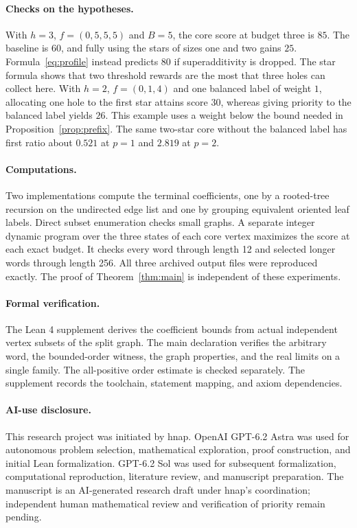 \documentclass[11pt]{article}
\theoremstyle{definition}\newtheorem{example}[theorem]{Example}
\begin{document}
\paragraph{Checks on the hypotheses.}
With $h=3$, $f=(0,5,5,5)$ and $B=5$, the core score at budget three is $85$. The baseline is $60$, and fully using the stars of sizes one and two gains $25$. Formula~\eqref{eq:profile} instead predicts $80$ if superadditivity is dropped. The star formula shows that two threshold rewards are the most that three holes can collect here. With $h=2$, $f=(0,1,4)$ and one balanced label of weight $1$, allocating one hole to the first star attains score $30$, whereas giving priority to the balanced label yields $26$. This example uses a weight below the bound needed in Proposition~\ref{prop:prefix}. The same two-star core without the balanced label has first ratio about $0.521$ at $p=1$ and $2.819$ at $p=2$.

\paragraph{Computations.}
Two implementations compute the terminal coefficients, one by a rooted-tree recursion on the undirected edge list and one by grouping equivalent oriented leaf labels. Direct subset enumeration checks small graphs. A separate integer dynamic program over the three states of each core vertex maximizes the score at each exact budget. It checks every word through length 12 and selected longer words through length 256. All three archived output files were reproduced exactly. The proof of Theorem~\ref{thm:main} is independent of these experiments.

\paragraph{Formal verification.}
The Lean 4 supplement derives the coefficient bounds from actual independent vertex subsets of the split graph. The main declaration verifies the arbitrary word, the bounded-order witness, the graph properties, and the real limits on a single family. The all-positive order estimate is checked separately. The supplement records the toolchain, statement mapping, and axiom dependencies.

\paragraph{AI-use disclosure.} This research project was initiated by hnap. OpenAI GPT-6.2 Astra was used for autonomous problem selection, mathematical exploration, proof construction, and initial Lean formalization. GPT-6.2 Sol was used for subsequent formalization, computational reproduction, literature review, and manuscript preparation. The manuscript is an AI-generated research draft under hnap's coordination; independent human mathematical review and verification of priority remain pending.



\end{document}
